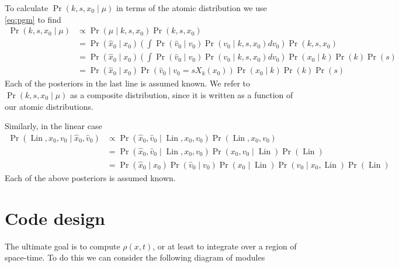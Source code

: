 \documentclass[12pt]{amsart}
\DeclareMathOperator{\Lin}{Lin}
\begin{document}
To calculate $\Pr(k,s,x_0 \mid \mu )$ in terms of the atomic distribution we use \eqref{eq:pgm} to find
\begin{align*}
	\Pr( k,s,x_0 \mid \mu ) &\propto \Pr( \mu \mid k,s,x_0) \Pr( k,s,x_0) \\
		&= \Pr( \hat{x}_0 \mid x_0) \left(  \int \Pr( \hat{v}_0 \mid v_0 ) \Pr( v_0 \mid k,s,x_0) dv_0 \right) \Pr(k,s,x_0) \\
		&=  \Pr( \hat{x}_0 \mid x_0) \left(  \int \Pr( \hat{v}_0 \mid v_0 ) \Pr( v_0 \mid k,s,x_0) dv_0 \right) \Pr(x_0 \mid k) \Pr(k) \Pr(s) \\
		&=  \Pr( \hat{x}_0 \mid x_0) \Pr( \hat{v}_0 \mid v_0 = sX_k(x_0) ) \Pr(x_0 \mid k) \Pr(k) \Pr(s)
\end{align*}
Each of the posteriors in the last line is assumed known.  We refer to $\Pr(k,s,x_0 \mid \mu)$ as a composite distribution, since it is written as a function of our atomic distributions.

Similarly, in the linear case
\begin{align*}
	\Pr( \Lin , x_0, v_0 \mid \hat{x}_0, \hat{v}_0 ) &\propto \Pr( \hat{x}_0, \hat{v}_0 \mid \Lin, x_0, v_0 ) \Pr( \Lin, x_0, v_0 ) \\
	&= \Pr( \hat{x}_0, \hat{v}_0 \mid \Lin, x_0, v_0 ) \Pr( x_0, v_0 \mid \Lin ) \Pr(\Lin) \\
	&= \Pr( \hat{x}_0 \mid x_0 ) \Pr( \hat{v}_0 \mid v_0 ) \Pr( x_0 \mid \Lin ) \Pr( v_0 \mid x_0, \Lin ) \Pr(\Lin)
\end{align*}
Each of the above posteriors is assumed known.


\section{Code design}

The ultimate goal is to compute $\rho(x,t)$, or at least to integrate over a region of space-time.
To do this we can consider the following diagram of modules

\end{document}
